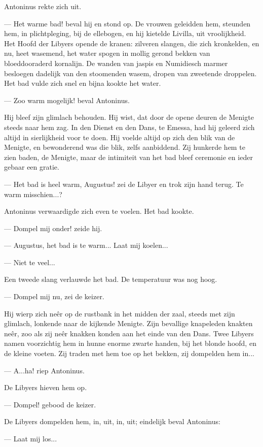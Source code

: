 \documentclass[a4paper, 12pt, oneside, dutch]{article}
\begin{document}
Antoninus rekte zich uit.

--- Het warme bad! beval hij en stond op. De vrouwen geleidden hem, steunden hem, in plichtpleging, bij de ellebogen, en hij kietelde Livilla, uit vroolijkheid. Het Hoofd der Libyers opende de kranen: zilveren slangen, die zich kronkelden, en nu, heet wasemend, het water spogen in mollig gerond bekken van bloeddooraderd kornalijn. De wanden van jaspis en Numidiesch marmer besloegen dadelijk van den stoomenden wasem, dropen van zweetende droppelen. Het bad vulde zich snel en bijna kookte het water.

--- Zoo warm mogelijk! beval Antoninus.

Hij bleef zijn glimlach behouden. Hij wist, dat door de opene deuren de Menigte steeds naar hem zag. In den Dienst en den Dans, te Emessa, had hij geleerd zich altijd in sierlijkheid voor te doen. Hij voelde altijd op zich den blik van de Menigte, en bewonderend was die blik, zelfs aanbiddend. Zij hunkerde hem te zien baden, de Menigte, maar de intimiteit van het bad bleef ceremonie en ieder gebaar een gratie.

--- Het bad is heel warm, Augustus! zei de Libyer en trok zijn hand terug. Te warm misschien...?

Antoninus verwaardigde zich even te voelen. Het bad kookte.

--- Dompel mij onder! zeide hij.

--- Augustus, het bad is te warm... Laat mij koelen...

--- Niet te veel...

Een tweede slang verlauwde het bad. De temperatuur was nog hoog.

--- Dompel mij nu, zei de keizer.

Hij wierp zich neêr op de rustbank in het midden der zaal, steeds met zijn glimlach, lonkende naar de kijkende Menigte. Zijn bevallige knapeleden knakten neêr, zoo als zij neêr knakken konden aan het einde van den Dans. Twee Libyers namen voorzichtig hem in hunne enorme zwarte handen, bij het blonde hoofd, en de kleine voeten. Zij traden met hem toe op het bekken, zij dompelden hem in...

--- A...ha! riep Antoninus.

De Libyers hieven hem op.

--- Dompel! gebood de keizer.

De Libyers dompelden hem, in, uit, in, uit; eindelijk beval Antoninus:

--- Laat mij los...
\end{document}
